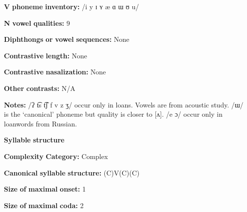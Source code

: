\begin{styleBody}
\textbf{V} \textbf{phoneme} \textbf{inventory:} /i y ɪ ʏ æ ɑ ɯ ʊ u/
\end{styleBody}

\begin{styleBody}
\textbf{N} \textbf{vowel} \textbf{qualities:} 9
\end{styleBody}

\begin{styleBody}
\textbf{Diphthongs} \textbf{or} \textbf{vowel} \textbf{sequences:} None
\end{styleBody}

\begin{styleBody}
\textbf{Contrastive} \textbf{length:} None
\end{styleBody}

\begin{styleBody}
\textbf{Contrastive} \textbf{nasalization:} None
\end{styleBody}

\begin{styleBody}
\textbf{Other} \textbf{contrasts:} N/A
\end{styleBody}

\begin{styleBody}
\textbf{Notes:} /ʔ t͡s t͡ʃ f v z ʒ/ occur only in loans. Vowels are from \citet{CarterRobbins2016} acoustic study. /ɯ/ is the ‘canonical’ phoneme but quality is closer to [ʌ]. /e ɔ/ occur only in loanwords from Russian.
\end{styleBody}

\begin{styleBody}
\textbf{Syllable} \textbf{structure}
\end{styleBody}

\begin{styleBody}
\textbf{Complexity} \textbf{Category:} Complex
\end{styleBody}

\begin{styleBody}
\textbf{Canonical} \textbf{syllable} \textbf{structure:} (C)V(C)(C) \citep[12-18]{Poppe1964}
\end{styleBody}

\begin{styleBody}
\textbf{Size} \textbf{of} \textbf{maximal} \textbf{onset:} 1
\end{styleBody}

\begin{styleBody}
\textbf{Size} \textbf{of} \textbf{maximal} \textbf{coda:} 2
\end{styleBody}

